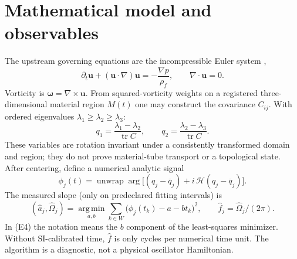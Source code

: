 \documentclass[11pt,a4paper]{article}
\newcommand{\rhoF}{\rho_{\!f}}
\begin{document}
\section{Mathematical model and observables}
The upstream governing equations are the incompressible Euler system \cite{Saffman1992},
\begin{equation}\partial_t\mathbf u+(\mathbf u\cdot\nabla)\mathbf u=-\frac{\nabla p}{\rhoF},\qquad \nabla\cdot\mathbf u=0.\tag{E1}\end{equation}
Vorticity is $\bm\omega=\nabla\times\mathbf u$. From squared-vorticity weights on a registered three-dimensional material region $M(t)$ one may construct the covariance $C_{ij}$. With ordered eigenvalues $\lambda_1\geq\lambda_2\geq\lambda_3$:
\begin{equation}
q_1=\frac{\lambda_1-\lambda_2}{\operatorname{tr}C},\qquad q_2=\frac{\lambda_2-\lambda_3}{\operatorname{tr}C}.\tag{E2}
\end{equation}
These variables are rotation invariant under a consistently transformed domain and region; they do not prove material-tube transport or a topological state. After centering, define a numerical analytic signal \cite{Gabor1946}
\begin{equation}
\phi_j(t)=\operatorname{unwrap}\arg\big[(q_j-\overline q_j)+i\,\mathcal{H}(q_j-\overline q_j)\big].\tag{E3}
\end{equation}
The measured slope (only on predeclared fitting intervals) is
\begin{equation}
(\widehat a_j,\widehat\Omega_j)=\operatorname*{arg\,min}_{a,b}\sum_{k\in W}\big(\phi_j(t_k)-a-bt_k\big)^2,\qquad \widehat f_j=\widehat\Omega_j/(2\pi).\tag{E4}
\end{equation}
In (E4) the notation means the $b$ component of the least-squares minimizer. Without SI-calibrated time, $\widehat f$ is only cycles per numerical time unit. The algorithm is a diagnostic, not a physical oscillator Hamiltonian.

\end{document}
